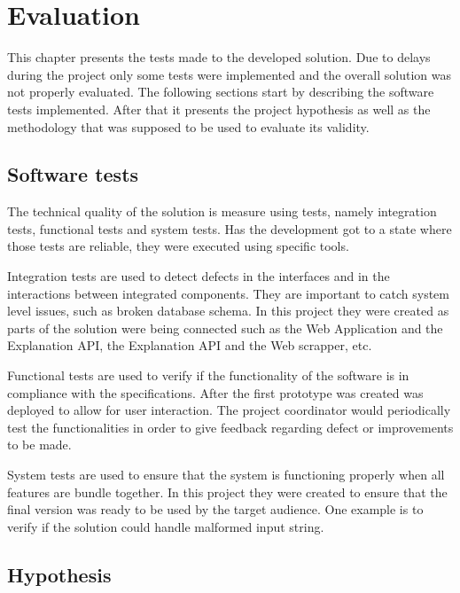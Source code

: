 
\chapter{Evaluation} %
\label{chap:Chapter6}

This chapter presents the tests made to the developed solution.
Due to delays during the project only some tests were implemented and the overall solution was not properly evaluated.
The following sections start by describing the software tests implemented.
After that it presents the project hypothesis as well as the methodology that was supposed to be used to evaluate its validity.

\section{Software tests}

The technical quality of the solution is measure using tests, namely integration tests, functional tests and system tests.
Has the development got to a state where those tests are reliable, they were executed using specific tools.

Integration tests are used to detect defects in the interfaces and in the interactions between integrated components.
They are important to catch system level issues, such as broken database schema.
In this project they were created as parts of the solution were being connected such as the Web Application and the Explanation API, the Explanation API and the Web scrapper, etc.

Functional tests are used to verify if the functionality of the software is in compliance with the specifications.
After the first prototype was created was deployed to allow for user interaction.
The project coordinator would periodically test the functionalities in order to give feedback regarding defect or improvements to be made.

System tests are used to ensure that the system is functioning properly when all features are bundle together.
In this project they were created to ensure that the final version was ready to be used by the target audience.
One example is to verify if the solution could handle malformed input string.

\section{Hypothesis}


